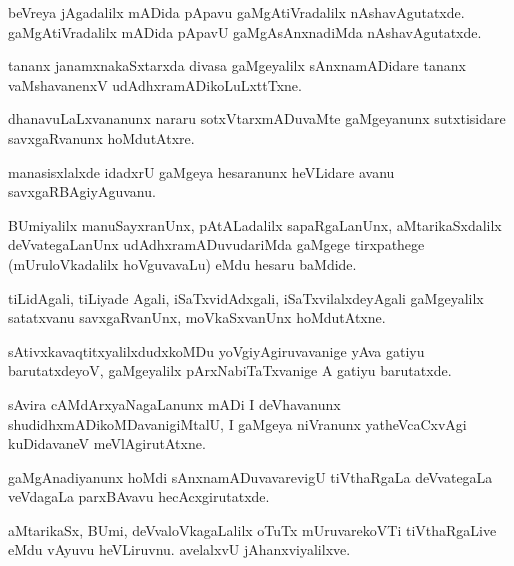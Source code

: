 \documentclass{article}
\begin{document}
\begin{mng}%
beVreya jAgadalilx mADida pApavu gaMgAtiVradalilx nAshavAgutatxde. gaMgAtiVradalilx mADida pApavU gaMgAsAnxnadiMda nAshavAgutatxde.
\end{mng}

\begin{mng}%
tananx janamxnakaSxtarxda divasa gaMgeyalilx sAnxnamADidare tananx vaMshavanenxV udAdhxramADikoLuLxttTxne.
\end{mng}

\begin{mng}%
dhanavuLaLxvananunx nararu sotxVtarxmADuvaMte gaMgeyanunx sutxtisidare savxgaRvanunx hoMdutAtxre.
\end{mng}

\begin{mng}%
manasisxlalxde idadxrU gaMgeya hesaranunx heVLidare avanu savxgaRBAgiyAguvanu.
\end{mng}

\begin{mng}%
BUmiyalilx  manuSayxranUnx, pAtALadalilx sapaRgaLanUnx, aMtarikaSxdalilx deVvategaLanUnx udAdhxramADuvudariMda gaMgege tirxpathege (mUruloVkadalilx hoVguvavaLu) eMdu hesaru baMdide.
\end{mng}

\begin{mng}%
tiLidAgali, tiLiyade Agali, iSaTxvidAdxgali, iSaTxvilalxdeyAgali gaMgeyalilx satatxvanu savxgaRvanUnx, moVkaSxvanUnx hoMdutAtxne.
\end{mng}

\begin{mng}%
sAtivxkavaqtitxyalilxdudxkoMDu yoVgiyAgiruvavanige yAva gatiyu barutatxdeyoV, gaMgeyalilx pArxNabiTaTxvanige A gatiyu barutatxde.
\end{mng}

\begin{mng}%
sAvira cAMdArxyaNagaLanunx mADi I deVhavanunx shudidhxmADikoMDavanigiMtalU, I gaMgeya niVranunx yatheVcaCxvAgi kuDidavaneV meVlAgirutAtxne.
\end{mng}

\begin{mng}%
gaMgAnadiyanunx hoMdi sAnxnamADuvavarevigU tiVthaRgaLa deVvategaLa veVdagaLa parxBAvavu hecAcxgirutatxde.
\end{mng}

\begin{mng}%
aMtarikaSx, BUmi, deVvaloVkagaLalilx oTuTx mUruvarekoVTi tiVthaRgaLive eMdu vAyuvu heVLiruvnu. avelalxvU jAhanxviyalilxve.
\end{mng}
\end{document}

